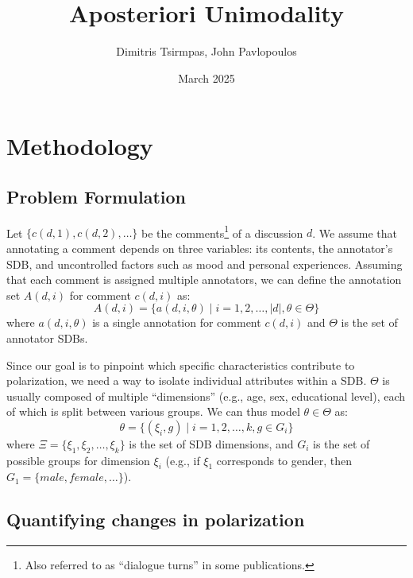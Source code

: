 \documentclass{article}
\title{Aposteriori Unimodality}
\author{Dimitris Tsirmpas, John Pavlopoulos}
\date{March 2025}
\begin{document}
\maketitle

\section{Methodology}

\subsection{Problem Formulation}
\label{ssec:methodology:problem}

Let $\{c(d,1), c(d,2), \ldots\}$ be the comments\footnote{Also referred to as “dialogue turns” in some publications.} of a discussion $d$. We assume that annotating a comment depends on three variables: its contents, the annotator's \ac{SDB}, and uncontrolled factors such as mood and personal experiences. Assuming that each comment is assigned multiple annotators, we can define the annotation set $A(d, i)$ for comment $c(d, i)$ as:
\begin{equation}
    A(d, i) = \{a(d, i, \theta) \mid i=1, 2, \ldots, \lvert d \rvert, \theta \in \Theta \}
\end{equation}
\noindent where  $a(d, i, \theta)$ is a single annotation for comment $c(d,i)$ and $\Theta$ is the set of annotator \acp{SDB}.

Since our goal is to pinpoint which specific characteristics contribute to polarization, we need a way to isolate individual attributes within a \ac{SDB}. $\Theta$ is usually composed of multiple ``dimensions'' (e.g., age, sex, educational level), each of which is split between various groups. We can thus model $\theta \in \Theta$ as:
\begin{equation}
    \theta = \{(\xi_i, g) \mid i=1, 2, \ldots, k \mathpunct{,} g \in G_i\}
\end{equation} 
\noindent where $\Xi=\{\xi_1, \xi_2, \ldots, \xi_k\}$ is the set of \ac{SDB} dimensions, and $G_i$ is the set of possible groups for dimension $\xi_i$ (e.g., if $\xi_1$ corresponds to gender, then $G_1=\{\textit{male}, \textit{female}, \ldots\}$).


\subsection{Quantifying changes in polarization}
\label{ssec:methodology:polstat}
\end{document}
